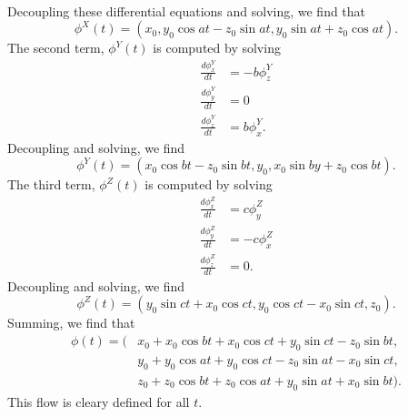 \documentclass{../mathnotes}
\begin{document}
\begin{enumerate}[(a)]
\begin{align*}
        \end{align*}
        Decoupling these differential equations and solving, we find that
        \[\phi^X(t)=(x_0,y_0\cos at-z_0\sin at,y_0\sin at+z_0\cos at).\]
        The second term, $\phi^Y(t)$ is computed by solving
        \begin{align*}
            \frac{d\phi_x^Y}{dt}&=-b\phi^Y_z\\
            \frac{d\phi_y^Y}{dt}&=0\\
            \frac{d\phi_z^Y}{dt}&=b\phi^Y_x.
        \end{align*}
        Decoupling and solving, we find 
        \[\phi^Y(t)=(x_0\cos bt-z_0\sin bt,y_0,x_0\sin by+z_0\cos bt).\]
        The third term, $\phi^Z(t)$ is computed by solving
        \begin{align*}
            \frac{d\phi_x^Z}{dt} &= c\phi_y^Z\\
            \frac{d\phi_y^Z}{dt} &= -c\phi_x^Z\\
            \frac{d\phi_z^Z}{dt} &= 0.
        \end{align*}
        Decoupling and solving, we find
        \[\phi^Z(t)=(y_0\sin ct+x_0\cos ct,y_0\cos ct-x_0\sin ct,z_0).\]
        Summing, we find that
        \begin{align*}
            \phi(t)=(&x_0+x_0\cos bt+x_0\cos ct+y_0\sin ct-z_0\sin bt,\\
            &y_0+y_0\cos at+y_0\cos ct-z_0\sin at-x_0\sin ct,\\
            &z_0+z_0\cos bt+z_0\cos at+y_0\sin at+x_0\sin bt).
        \end{align*}
        This flow is cleary defined for all $t$.
\end{enumerate}
\end{document}
